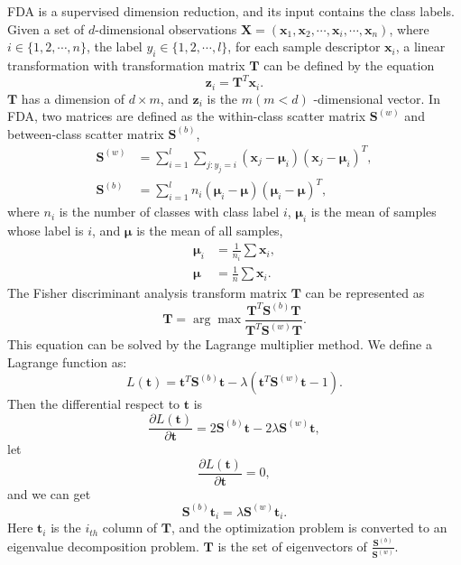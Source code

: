 FDA is a supervised dimension reduction, and its input contains the class labels. Given a set of $d$-dimensional observations $\bm{X} = (\bm{x}_1, \bm{x}_2,\cdots,\bm{x}_i,\cdots,\bm{x}_n)$, where $i\in\{1,2,\cdots,n\}$, the label $y_i\in\{1,2,\cdots,l\}$, for each sample descriptor $\bm{x}_i$, a linear transformation with transformation matrix $\bm{T}$ can be defined by the equation
\begin{equation}
\bm{z}_i = \bm{T}^T\bm{x}_i.
\end{equation}
$\bm{T}$ has a dimension of $d\times m$, and $\bm{z}_i$ is the $m(m<d)$ -dimensional vector. In FDA, two matrices are defined as the within-class scatter matrix $\bm{S}^{(w)}$ and between-class scatter matrix $\bm{S}^{(b)}$, 
\begin{equation}
\begin{aligned}
\bm{S}^{(w)} &= \mathop{\sum} _{i=1}^l\mathop{\sum}_{j:y_j = i} (\bm{x}_j - \bm{\mu}_i)(\bm{x}_j - \bm{\mu}_i)^T,\\
\bm{S}^{(b)}  &= \mathop{\sum} _{i=1}^l n_i(\bm{\mu}_i - \bm{\mu})(\bm{\mu}_i - \bm{\mu})^T,
\end{aligned}
\end{equation}
where $n_i$ is the number of classes with class label $i$, $\bm{\mu}_i$ is the mean of samples whose label is $i$, and $\bm{\mu}$ is the mean of all samples, 
\begin{equation}
\begin{aligned}
\bm{\mu}_i &= \frac{1}{n_i} \sum \bm{x}_i, \\
\bm{\mu} &= \frac{1}{n} \sum \bm{x}_i.
\end{aligned}
\end{equation}
The Fisher discriminant analysis transform matrix $\bm{T}$ can be represented as 
\begin{equation}
\bm{T} = \arg\max \frac{\bm{T}^T\bm{S}^{(b)}\bm{T}}{\bm{T}^T\bm{S}^{(w)}\bm{T}}.
\end{equation}
This equation can be solved by the Lagrange multiplier method. We define a Lagrange function as:
\begin{equation}
L(\bm{t}) = \bm{t}^T\bm{S}^{(b)}\bm{t} - \lambda(\bm{t}^T\bm{S}^{(w)}\bm{t} - 1).
\end{equation}
Then the differential respect to $\bm{t}$ is 
\begin{equation}
\frac{\partial L(\bm{t})}{\partial \bm{t}} = 2\bm{S}^{(b)}\bm{t} - 2\lambda \bm{S}^{(w)}\bm{t},
\end{equation}
let 
\begin{equation}
\frac{\partial L(\bm{t})}{\partial \bm{t}} = 0,
\end{equation}
and we can get 
\begin{equation}\label{eigen1}
\bm{S}^{(b)}\bm{t}_i  = \lambda \bm{S}^{(w)}\bm{t}_i.
\end{equation}
Here $\bm{t}_i$ is the $i_{th}$ column of $\bm{T}$, and the optimization problem is converted to an eigenvalue decomposition problem. $\bm{T}$ is the set of eigenvectors of $\frac{\bm{S}^{(b)}}{\bm{S}^{(w)}}$.

